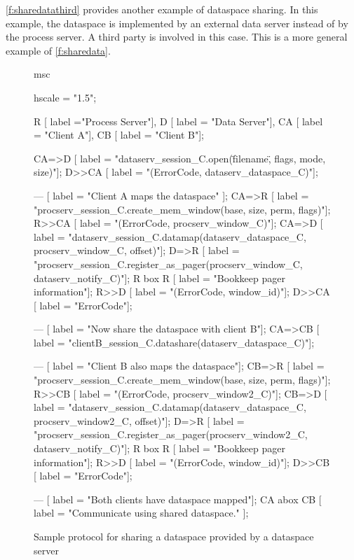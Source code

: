 \clearpage

\autoref{f:sharedatathird} provides another example of dataspace sharing. In this example, the dataspace is implemented by an external data server instead of by the process server. A third party is involved in this case. This is a more general example of \autoref{f:sharedata}.

\begin{figure}[h]
  \begin{center}
    \begin{msc}
      msc {
        hscale = "1.5";

        R [ label ="Process Server"],
        D [ label = "Data Server"],
        CA [ label = "Client A"],
        CB [ label = "Client B"];
        
        CA=>D [ label = "dataserv\_session\_C.open(\"filename\", flags, mode, size)"];
        D>>CA [ label = "(ErrorCode, dataserv\_dataspace\_C)"];

        --- [ label = "Client A maps the dataspace" ];
        CA=>R [ label = "procserv\_session\_C.create\_mem\_window(base, size, perm, flags)"];
        R>>CA [ label = "(ErrorCode, procserv\_window\_C)"];
        CA=>D [ label = "dataserv\_session\_C.datamap(dataserv\_dataspace\_C, procserv\_window\_C, offset)"];
        D=>R [ label = "procserv\_session\_C.register\_as\_pager(procserv\_window\_C, dataserv\_notify\_C)"];
        R box R [ label = "Bookkeep pager information"];
        R>>D [ label = "(ErrorCode, window\_id)"];
        D>>CA [ label = "ErrorCode"];

        --- [ label = "Now share the dataspace with client B"];
        CA=>CB [ label = "clientB\_session\_C.datashare(dataserv\_dataspace\_C)"];

        --- [ label = "Client B also maps the dataspace"];
        CB=>R [ label = "procserv\_session\_C.create\_mem\_window(base, size, perm, flags)"];
        R>>CB [ label = "(ErrorCode, procserv\_window2\_C)"];
        CB=>D [ label = "dataserv\_session\_C.datamap(dataserv\_dataspace\_C, procserv\_window2\_C, offset)"];
        D=>R [ label = "procserv\_session\_C.register\_as\_pager(procserv\_window2\_C, dataserv\_notify\_C)"];
        R box R [ label = "Bookkeep pager information"];
        R>>D [ label = "(ErrorCode, window\_id)"];
        D>>CB [ label = "ErrorCode"];

        --- [ label = "Both clients have dataspace mapped"];
        CA abox CB [ label = "Communicate using shared dataspace." ];
      }
    \end{msc}
  \end{center}
  \caption{Sample protocol for sharing a dataspace provided by a dataspace server}
  \label{f:sharedatathird}
\end{figure}

